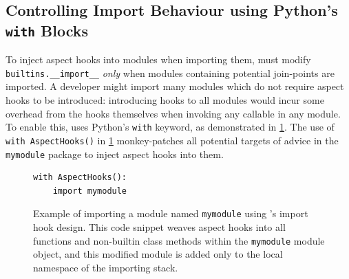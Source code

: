 \subsection{Controlling Import Behaviour using Python's \lstinline{with} Blocks}
\label{pdsf3implementingimporthooks}

To inject aspect hooks into modules when importing them, \pdsfthree{} must
modify \lstinline{builtins.__import__} \emph{only} when modules containing
potential join-points are imported. A developer might import many modules
which do not require aspect hooks to be introduced: introducing hooks to all
modules would incur some overhead from the hooks themselves when invoking any
callable in any module. To enable this, \pdsfthree{} uses Python's
\lstinline{with} keyword, as demonstrated in
\cref{fig:simple_aspect_hook_weaving_example}. The use of \lstinline{with AspectHooks()}
in \cref{fig:simple_aspect_hook_weaving_example} monkey-patches
all potential targets of advice in the \lstinline{mymodule} package to inject
aspect hooks into them.

\begin{figure}
    \centering
    \begin{lstlisting}[style=footnotesize_python]
with AspectHooks():
    import mymodule
    \end{lstlisting}
    \caption{Example of importing a module named \lstinline{mymodule} using
    \pdsfthree{}'s import hook design. This code snippet weaves aspect hooks into all
    functions and non-builtin class methods within the \lstinline{mymodule}
    module object, and this modified module is added only to the local namespace
    of the importing stack.}
    \label{fig:simple_aspect_hook_weaving_example}
\end{figure}

